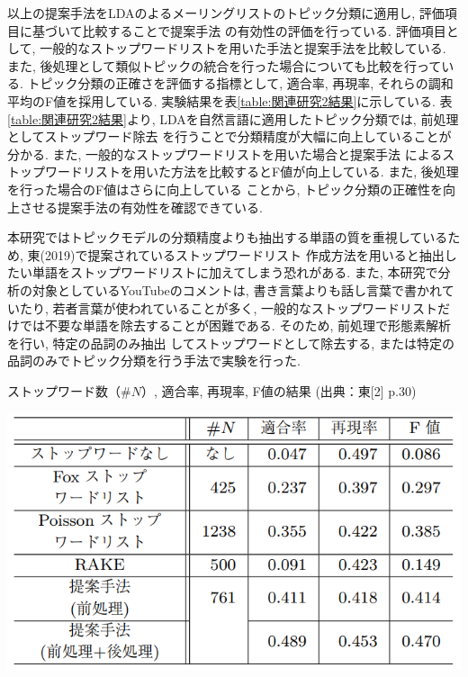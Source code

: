 \documentclass{ltjarticle}
\begin{document}
以上の提案手法をLDAのよるメーリングリストのトピック分類に適用し, 評価項目に基づいて比較することで提案手法
の有効性の評価を行っている. 評価項目として, 一般的なストップワードリストを用いた手法と提案手法を比較している. 
また, 後処理として類似トピックの統合を行った場合についても比較を行っている. 
トピック分類の正確さを評価する指標として, 適合率, 再現率, それらの調和平均のF値を採用している. 
実験結果を表\ref{table:関連研究2結果}に示している. 表\ref{table:関連研究2結果}より, LDAを自然言語に適用したトピック分類では, 前処理としてストップワード除去
を行うことで分類精度が大幅に向上していることが分かる. また, 一般的なストップワードリストを用いた場合と提案手法
によるストップワードリストを用いた方法を比較するとF値が向上している. また, 後処理を行った場合のF値はさらに向上している
ことから, トピック分類の正確性を向上させる提案手法の有効性を確認できている. 

本研究ではトピックモデルの分類精度よりも抽出する単語の質を重視しているため, 東(2019)で提案されているストップワードリスト
作成方法を用いると抽出したい単語をストップワードリストに加えてしまう恐れがある. 
また, 本研究で分析の対象としているYouTubeのコメントは, 書き言葉よりも話し言葉で書かれていたり, 若者言葉が使われていることが多く, 
一般的なストップワードリストだけでは不要な単語を除去することが困難である. そのため, 前処理で形態素解析を行い, 特定の品詞のみ抽出
してストップワードとして除去する, または特定の品詞のみでトピック分類を行う手法で実験を行った. 
\begin{table}
    \centering
    \caption{ストップワード数（$\#N$）, 適合率, 再現率, F値の結果 (出典：東[2] p.30)}
    \vspace{5truept}
    \includegraphics[]{images/table2.png}
    \label{table:関連研究2結果}
\end{table}
\vspace{10truept}
\end{document}
